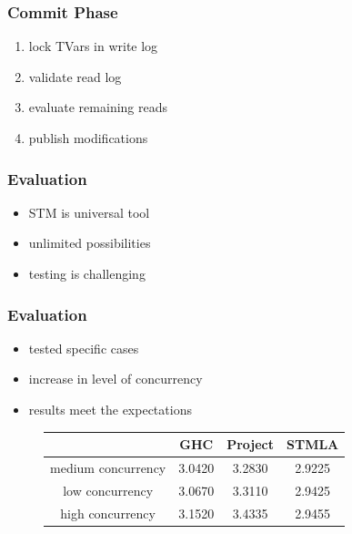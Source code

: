 \documentclass{beamer}
\begin{document}
  
  \begin{frame}
  \frametitle{Commit Phase}
  \begin{enumerate}\setlength\itemsep{1em}
   \item lock TVars in write log
   \item validate read log
   \item evaluate remaining reads
   \item publish modifications
  \end{enumerate}
  \end{frame}
  
  

  \begin{frame}
  \frametitle{Evaluation}
  \begin{itemize}\setlength\itemsep{1em}
   \item STM is universal tool
   \item unlimited possibilities
   \item testing is challenging
  \end{itemize}
  \end{frame}

  \begin{frame}
  \frametitle{Evaluation}
  \begin{itemize}\setlength\itemsep{1em}
   \item tested specific cases
   \item increase in level of concurrency
   \item results meet the expectations
  \end{itemize}
  \end{frame}
   
\begin{frame}
\begin{figure}
\centering
 \begin{tabular}[center]{|c|c|c|c|}
  \hline
	                       & GHC    & Project & STMLA  \\ \hline
  medium concurrency  & 3.0420 &  3.2830 & 2.9225 \\ \hline
  low concurrency     & 3.0670 &  3.3110 & 2.9425 \\ \hline
  high concurrency    & 3.1520 &  3.4335 & 2.9455 \\ \hline
 \end{tabular}
\end{figure}
\end{frame}
  
\end{document}
